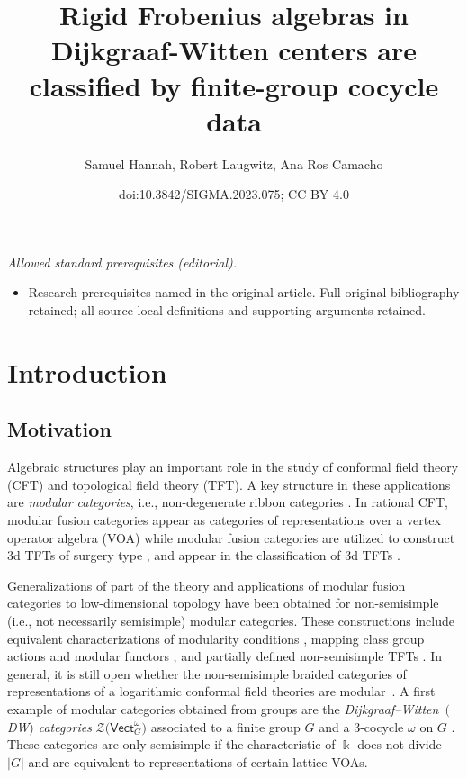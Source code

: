 \documentclass[10pt,a4paper]{amsart}
\title{Rigid Frobenius algebras in Dijkgraaf-Witten centers are classified by finite-group cocycle data}
\author{Samuel Hannah, Robert Laugwitz, Ana Ros Camacho}
\date{doi:10.3842/SIGMA.2023.075; CC BY 4.0}
\numberwithin{equation}{section}
\newcommand{\Vect}{\mathsf{Vect}}
\newcommand{\cZ}{\mathcal{Z}}
\begin{document}
\maketitle
\noindent\textit{Allowed standard prerequisites (editorial).}\begin{itemize}
\item Research prerequisites named in the original article. Full original bibliography retained; all source-local definitions and supporting arguments retained.
\end{itemize}\medskip
\section{Introduction}%

\subsection{Motivation}

Algebraic structures play an important role in the study of conformal field theory (CFT) and topological field theory (TFT). A key structure in these applications are \emph{modular categories}, i.e., non-degenerate ribbon categories \cite{KL,Shi1}. In rational CFT, modular fusion categories appear as categories of representations over a vertex operator algebra (VOA) \cite{Hua} while modular fusion categories are utilized to construct 3d TFTs of surgery type \cite{RT91,Tur}, and appear in the classification of 3d TFTs \cite{BDSV}.

Generalizations of part of the theory and applications of modular fusion categories to low-dimensional topology have been obtained for non-semisimple (i.e., not necessarily semisimple) modular categories. These constructions include equivalent characterizations of modularity conditions \cite{Shi1}, mapping class group actions and modular functors \cite{FSS,LMSS,SW}, and partially defined non-semisimple TFTs \cite{DGGPR, KL}.
In general, it is still open whether the non-semisimple braided categories of representations of a logarithmic conformal field theories are modular~\cite{HLZ, Len}. A first example of modular categories obtained from groups are the \emph{Dijkgraaf--Witten~$($DW$)$ categories} $\cZ\big(\Vect_G^\omega\big)$ associated to a finite group $G$ and a $3$-cocycle $\omega$ on $G$ \cite{DPR}. These categories are only semisimple if the characteristic of $\Bbbk$ does not divide $|G|$ and are equivalent to representations of certain lattice VOAs.
\end{document}

